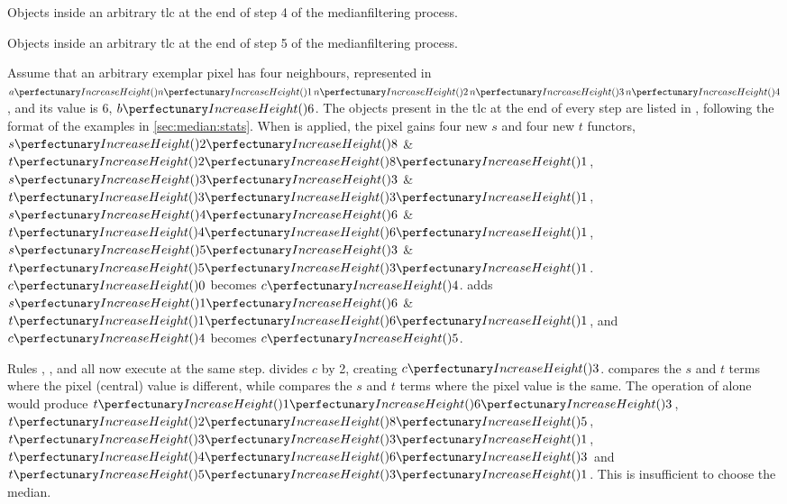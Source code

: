 \begin{cpobjectsfloat}
\begin{cpobjects}
\end{cpobjects}
\caption{\label{objs:medianfilter:ex4}Objects inside an arbitrary \gls{tlc} at the end of step 4 of the \gls{medianfilter}ing process.}
\end{cpobjectsfloat}

\begin{cpobjectsfloat}
\begin{cpobjects}
\end{cpobjects}
\caption{\label{objs:medianfilter:ex5}Objects inside an arbitrary \gls{tlc} at the end of step 5 of the \gls{medianfilter}ing process.}
\end{cpobjectsfloat}

Assume that an arbitrary exemplar pixel has four neighbours, represented in \(\cpfunc{a}{\cpfunc{n}{1} \, \cpfunc{n}{2} \, \cpfunc{n}{3} \, \cpfunc{n}{4}}\), and its value is 6, \(\cpfunc{b}{6}\).  The objects present in the \gls{tlc} at the end of every step are listed in , following the format of the examples in \vref{sec:median:stats}.  When  is applied, the pixel gains four new \(s\) and four new \(t\) functors, \(\cpfuncn{s}{2}{8}\) \& \(\cpfuncnn{t}{2}{8}{1}\), \(\cpfuncn{s}{3}{3}\) \& \(\cpfuncnn{t}{3}{3}{1}\), \(\cpfuncn{s}{4}{6}\) \& \(\cpfuncnn{t}{4}{6}{1}\), \(\cpfuncn{s}{5}{3}\) \& \(\cpfuncnn{t}{5}{3}{1}\).  \(\cpfunc{c}{0}\) becomes \(\cpfunc{c}{4}\).   adds \(\cpfuncn{s}{1}{6}\) \& \(\cpfuncnn{t}{1}{6}{1}\), and \(\cpfunc{c}{4}\) becomes \(\cpfunc{c}{5}\).

Rules , , and  all now execute at the same step.   divides \(c\) by 2, creating \(\cpfunc{c}{3}\).   compares the \(s\) and \(t\) terms where the pixel (central) value is different, while  compares the \(s\) and \(t\) terms where the pixel value is the same.  The operation of  alone would produce \(\cpfuncnn{t}{1}{6}{3}\), \(\cpfuncnn{t}{2}{8}{5}\), \(\cpfuncnn{t}{3}{3}{1}\), \(\cpfuncnn{t}{4}{6}{3}\) and \(\cpfuncnn{t}{5}{3}{1}\).  This is insufficient to choose the median.

